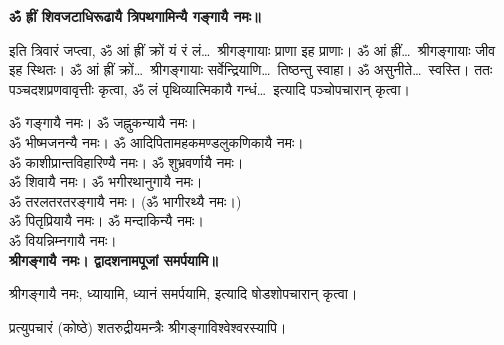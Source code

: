 
\begin{center}
\textbf{ॐ ह्रीं शिवजटाधिरूढायै त्रिपथगामिन्यै गङ्गायै नमः॥}
\end{center}

इति त्रिवारं जप्त्वा, ॐ आं ह्रीं क्रों यं रं लं\ldots\ श्रीगङ्गायाः प्राणा इह प्राणाः।
ॐ आं ह्रीं\ldots\ श्रीगङ्गायाः जीव इह स्थितः। ॐ आं ह्रीं क्रों\ldots\ श्रीगङ्गायाः
सर्वेन्द्रियाणि\ldots\ तिष्ठन्तु स्वाहा। ॐ असुनीते\ldots\ स्वस्ति। ततः पञ्चदशप्रणवावृत्तीः कृत्वा,
ॐ लं पृथिव्यात्मिकायै गन्धं\ldots\ इत्यादि पञ्चोपचारान् कृत्वा।


\begin{center}
ॐ गङ्गायै नमः। ॐ जह्नुकन्यायै नमः।\\
ॐ भीष्मजनन्यै नमः। ॐ आदिपितामहकमण्डलुकणिकायै नमः।\\
ॐ काशीप्रान्तविहारिण्यै नमः। ॐ शुभ्रवर्णायै नमः।\\
ॐ शिवायै नमः। ॐ भगीरथानुगायै नमः।\\
ॐ तरलतरतरङ्गायै नमः। (ॐ भागीरथ्यै नमः।)\\
ॐ पितृप्रियायै नमः। ॐ मन्दाकिन्यै नमः।\\
ॐ वियन्निम्नगायै नमः।\\
\textbf{श्रीगङ्गायै नमः। द्वादशनामपूजां समर्पयामि॥}
\end{center}

श्रीगङ्गायै नमः, ध्यायामि, ध्यानं समर्पयामि, इत्यादि षोडशोपचारान् कृत्वा।


{\small प्रत्युपचारं (कोष्ठे) शतरुद्रीयमन्त्रैः श्रीगङ्गाविश्वेश्वरस्यापि।\par}

